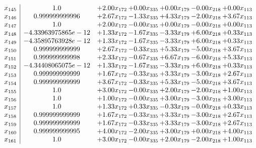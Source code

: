 \documentclass[8pt]{article}
\begin{document}
\[\begin{array}{c| c c@{\hskip 2pt} c@{\hskip 2pt} c@{\hskip 2pt} c@{\hskip 2pt} c@{\hskip 2pt} }
 x_{145}   &  1.0 & +  2.00 x_{172} & +  0.00 x_{335} & +  0.00 x_{179} & -0.00 x_{218} & +  0.00 x_{113}\\
 x_{146}   &  0.999999999996 & +  2.67 x_{172} & -1.33 x_{335} & +  4.33 x_{179} & -2.00 x_{218} & +  3.67 x_{113}\\
 x_{147}   &  1.0 & +  2.00 x_{172} & -0.00 x_{335} & +  0.00 x_{179} & -0.00 x_{218} & +  0.00 x_{113}\\
 x_{148}   &  -4.33963975865e-12 & +  1.33 x_{172} & -1.67 x_{335} & -3.33 x_{179} & +  6.00 x_{218} & +  0.33 x_{113}\\
 x_{149}   &  -4.35895763928e-12 & +  1.33 x_{172} & -1.67 x_{335} & -3.33 x_{179} & +  6.00 x_{218} & +  0.33 x_{113}\\
 x_{150}   &  0.999999999999 & +  2.67 x_{172} & -0.33 x_{335} & +  5.33 x_{179} & -5.00 x_{218} & +  3.67 x_{113}\\
 x_{151}   &  0.999999999998 & +  2.33 x_{172} & -0.67 x_{335} & +  6.67 x_{179} & -6.00 x_{218} & +  5.33 x_{113}\\
 x_{152}   &  -4.34408065075e-12 & +  1.33 x_{172} & -1.67 x_{335} & -3.33 x_{179} & +  6.00 x_{218} & +  0.33 x_{113}\\
 x_{153}   &  0.999999999999 & +  1.67 x_{172} & -0.33 x_{335} & +  3.33 x_{179} & -3.00 x_{218} & +  2.67 x_{113}\\
 x_{154}   &  0.999999999999 & +  3.67 x_{172} & -0.33 x_{335} & +  5.33 x_{179} & -5.00 x_{218} & +  3.67 x_{113}\\
 x_{155}   &  1.0 & +  3.00 x_{172} & -0.00 x_{335} & +  2.00 x_{179} & -2.00 x_{218} & +  1.00 x_{113}\\
 x_{156}   &  1.0 & +  1.00 x_{172} & -0.00 x_{335} & +  3.00 x_{179} & -3.00 x_{218} & +  3.00 x_{113}\\
 x_{157}   &  1.0 & +  1.33 x_{172} & +  0.33 x_{335} & -0.33 x_{179} & -0.00 x_{218} & +  0.33 x_{113}\\
 x_{158}   &  0.999999999999 & +  1.67 x_{172} & -0.33 x_{335} & +  3.33 x_{179} & -3.00 x_{218} & +  2.67 x_{113}\\
 x_{159}   &  0.999999999999 & +  1.67 x_{172} & -0.33 x_{335} & +  3.33 x_{179} & -3.00 x_{218} & +  2.67 x_{113}\\
 x_{160}   &  0.999999999995 & +  4.00 x_{172} & -2.00 x_{335} & +  3.00 x_{179} & +  0.00 x_{218} & +  4.00 x_{113}\\
 x_{161}   &  1.0 & +  3.00 x_{172} & -0.00 x_{335} & +  2.00 x_{179} & -2.00 x_{218} & +  1.00 x_{113}\\

\end{array}\]
\end{document}
